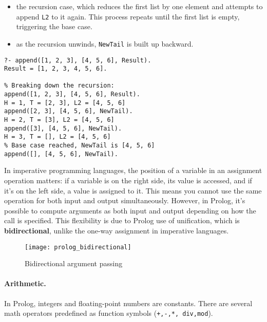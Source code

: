 \documentclass{article}
\begin{document}
\begin{itemize}
\begin{itemize}
                \begin{itemize}
                    \item the recursion case, which reduces the first list by
                        one element and attempts to append \texttt{L2} to it
                        again. This process repeats until the first list is
                        empty, triggering the base case.
                    \item as the recursion unwinds, \texttt{NewTail} is built
                        up backward.
                \end{itemize}
                \begin{example}
                   \begin{verbatim}
?- append([1, 2, 3], [4, 5, 6], Result).
Result = [1, 2, 3, 4, 5, 6].

% Breaking down the recursion:
append([1, 2, 3], [4, 5, 6], Result).
H = 1, T = [2, 3], L2 = [4, 5, 6]
append([2, 3], [4, 5, 6], NewTail). 
H = 2, T = [3], L2 = [4, 5, 6]
append([3], [4, 5, 6], NewTail).
H = 3, T = [], L2 = [4, 5, 6]
% Base case reached, NewTail is [4, 5, 6]
append([], [4, 5, 6], NewTail).
                   \end{verbatim} 
                \end{example}
        \end{itemize}
\end{itemize}
In imperative programming languages, the position of a variable in an
assignment operation matters: if a variable is on the right side, its value is
accessed, and if it's on the left side, a value is assigned to it. This means
you cannot use the same operation for both input and output simultaneously.
However, in Prolog, it's possible to compute arguments as both input and
output depending on how the call is specified. This flexibility is due to
Prolog use of unification, which is \textbf{bidirectional}, unlike the one-way
assignment in imperative languages.
\begin{figure}[!ht]
    \centering
    \texttt{[image: prolog\_bidirectional]}
    \caption{Bidirectional argument passing}
\end{figure}
\paragraph{Arithmetic.} In Prolog, integers and floating-point numbers are
constants. There are several math operators predefined as function symbols
(\texttt{+,-,*,\,div,mod}).
\end{document}
